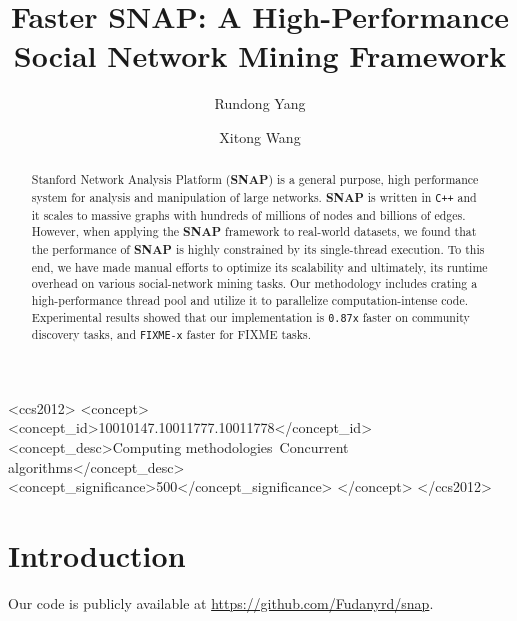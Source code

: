 \documentclass[acmlarge]{acmart}
\begin{document}
\title{Faster SNAP: A High-Performance Social Network Mining Framework}

\author{Rundong Yang}
\author{Xitong Wang}
\authornotemark[1]


\begin{abstract}
  Stanford Network Analysis Platform (\textbf{SNAP}) is a general purpose, high
  performance system for analysis and manipulation of large networks.
  \textbf{SNAP} is written in \texttt{C++} and it scales to massive graphs with hundreds
  of millions of nodes and billions of edges. However, when applying the \textbf{SNAP}
  framework to real-world datasets, we found that the performance of \textbf{SNAP}
  is highly constrained by its single-thread execution. To this end, we have made
  manual efforts to optimize its scalability and ultimately, its runtime overhead 
  on various social-network mining tasks. Our methodology includes crating a high-performance 
  thread pool and utilize it to parallelize computation-intense code. Experimental 
  results showed that our implementation is \texttt{0.87x} faster on community discovery tasks,
  and \texttt{FIXME-x} faster for FIXME tasks.
\end{abstract}

\begin{CCSXML}
<ccs2012>
   <concept>
       <concept_id>10010147.10011777.10011778</concept_id>
       <concept_desc>Computing methodologies~Concurrent algorithms</concept_desc>
       <concept_significance>500</concept_significance>
       </concept>
 </ccs2012>
\end{CCSXML}





\maketitle

\section{Introduction}
\par Our code is publicly available at \url{https://github.com/Fudanyrd/snap}.


\end{document}

